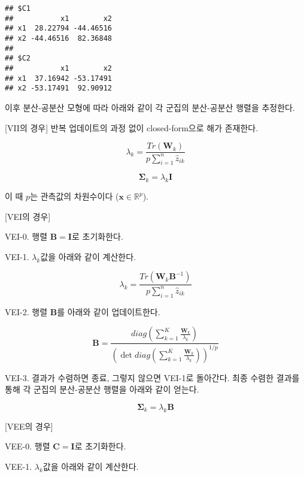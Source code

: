 \documentclass[
]{book}
\begin{document}
\begin{verbatim}
## $C1
##           x1        x2
## x1  28.22794 -44.46516
## x2 -44.46516  82.36848
## 
## $C2
##           x1        x2
## x1  37.16942 -53.17491
## x2 -53.17491  92.90912
\end{verbatim}

이후 분산-공분산 모형에 따라 아래와 같이 각 군집의 분산-공분산 행렬을 추정한다.

{[}VII의 경우{]} 반복 업데이트의 과정 없이 closed-form으로 해가 존재한다.

\begin{equation*}
\lambda_k = \frac{Tr(\mathbf{W}_k)}{p \sum_{i = 1}^{n} \hat{z}_{ik}}
\end{equation*}

\begin{equation*}
\boldsymbol\Sigma_k = \lambda_k \mathbf{I}
\end{equation*}

이 때 \(p\)는 관측값의 차원수이다 (\(\mathbf{x} \in \mathbb{R}^p\)).

{[}VEI의 경우{]}

VEI-0. 행렬 \(\mathbf{B} = \mathbf{I}\)로 초기화한다.

VEI-1. \(\lambda_k\)값을 아래와 같이 계산한다.

\begin{equation*}
\lambda_k = \frac{Tr(\mathbf{W}_k \mathbf{B}^{-1})}{p \sum_{i = 1}^{n} \hat{z}_{ik}}
\end{equation*}

VEI-2. 행렬 \(\mathbf{B}\)를 아래와 같이 업데이트한다.

\begin{equation*}
\mathbf{B} = \frac{diag\left( \sum_{k = 1}^{K} \frac{\mathbf{W}_k}{\lambda_k} \right)}{\left( \det diag\left( \sum_{k = 1}^{K} \frac{\mathbf{W}_k}{\lambda_k} \right) \right)^{1 / p}}
\end{equation*}

VEI-3. 결과가 수렴하면 종료, 그렇지 않으면 VEI-1로 돌아간다. 최종 수렴한 결과를 통해 각 군집의 분산-공분산 행렬을 아래와 같이 얻는다.

\begin{equation*}
\boldsymbol\Sigma_k = \lambda_k \mathbf{B}
\end{equation*}

{[}VEE의 경우{]}

VEE-0. 행렬 \(\mathbf{C} = \mathbf{I}\)로 초기화한다.

VEE-1. \(\lambda_k\)값을 아래와 같이 계산한다.
\end{document}
